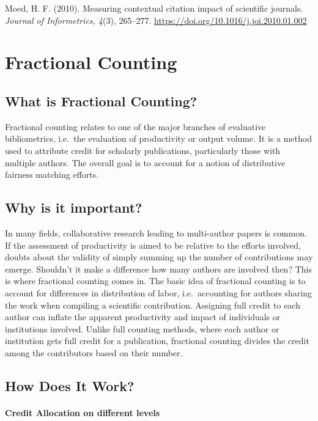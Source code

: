 \documentclass[
  letterpaper,
]{scrreprt}
\begin{document}
Moed, H. F. (2010). Measuring contextual citation impact of scientific
journals. \emph{Journal of Informetrics, 4}(3), 265--277.
\url{https://doi.org/10.1016/j.joi.2010.01.002}

\chapter{Fractional Counting}\label{fractional-counting}

\section{What is Fractional
Counting?}\label{what-is-fractional-counting}

Fractional counting relates to one of the major branches of evaluative
bibliometrics, i.e.~the evaluation of productivity or output volume. It
is a method used to attribute credit for scholarly publications,
particularly those with multiple authors. The overall goal is to account
for a notion of distributive fairness matching efforts.

\section{Why is it important?}\label{why-is-it-important-6}

In many fields, collaborative research leading to multi-author papers is
common. If the assessment of productivity is aimed to be relative to the
efforts involved, doubts about the validity of simply summing up the
number of contributions may emerge. Shouldn't it make a difference how
many authors are involved then? This is where fractional counting comes
in. The basic idea of fractional counting is to account for differences
in distribution of labor, i.e.~accounting for authors sharing the work
when compiling a scientific contribution. Assigning full credit to each
author can inflate the apparent productivity and impact of individuals
or institutions involved. Unlike full counting methods, where each
author or institution gets full credit for a publication, fractional
counting divides the credit among the contributors based on their
number.

\section{How Does It Work?}\label{how-does-it-work-5}

\subsubsection{Credit Allocation on different
levels}\label{credit-allocation-on-different-levels}
\end{document}
